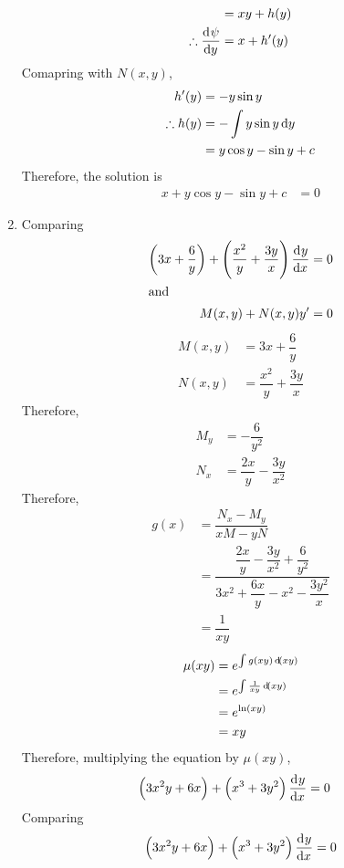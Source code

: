 \documentclass[fleqn, a4paper, 12pt, oneside]{amsart}
\theoremstyle{definition}
\theoremstyle{theorem}
\begin{document}
\begin{solution}
\begin{enumerate}[leftmargin=*]
\begin{align*}
				&= x y + h(y)\\
				\therefore \dod{\psi}{y} &= x + h'(y)
			\end{align*}
			Comapring with $N(x,y)$,
			\begin{align*}
				h'(y) &= -y \sin y\\
				\therefore h(y) &= -\int y \sin y \dif y\\
				&= y \cos y - \sin y + c
			\end{align*}
			Therefore, the solution is
			\begin{align*}
				x + y \cos y - \sin y + c &= 0
			\end{align*}
		\item 
			Comparing
			\begin{align*}
				\left( 3 x + \dfrac{6}{y} \right) + \left( \dfrac{x^2}{y} + \dfrac{3 y}{x} \right) \dod{y}{x} &= 0\\
				\intertext{and}
				M(x,y) + N(x,y) y' &= 0
			\end{align*}
			\begin{align*}
				M(x,y) &= 3 x + \dfrac{6}{y}\\
				N(x,y) &= \dfrac{x^2}{y} + \dfrac{3 y}{x}
			\end{align*}
			Therefore,
			\begin{align*}
				M_y &= -\dfrac{6}{y^2}\\
				N_x &= \dfrac{2 x}{y} - \dfrac{3 y}{x^2}
			\end{align*}
			Therefore,
			\begin{align*}
				g(x) &= \dfrac{N_x - M_y}{x M - y N}\\
				&= \dfrac{\dfrac{2 x}{y} - \dfrac{3 y}{x^2} + \dfrac{6}{y^2}}{3 x^2 + \dfrac{6 x}{y} - x^2 - \dfrac{3 y^2}{x}}\\
				&= \dfrac{1}{x y}
			\end{align*}
			\begin{align*}
				\mu(x y) &= e^{\int g(x y) \dif (x y)}\\
				&= e^{\int \frac{1}{x y} \dif (x y)}\\
				&= e^{\ln (x y)}\\
				&= x y
			\end{align*}
			Therefore, multiplying the equation by $\mu(x y)$,
			\begin{align*}
				\left( 3 x^2 y + 6 x \right) + \left( x^3 + 3 y^2 \right) \dod{y}{x} &= 0
			\end{align*}
			Comparing
			\begin{align*}
				\left( 3 x^2 y + 6 x \right) + \left( x^3 + 3 y^2 \right) \dod{y}{x} &= 0\\

\end{align*}
\end{enumerate}
\end{solution}
\end{document}
